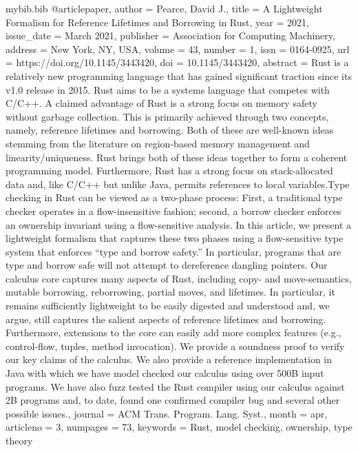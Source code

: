 \RequirePackage{filecontents}
\begin{filecontents*}{mybib.bib}
    @article{paper,
        author = {Pearce, David J.},
        title = {A Lightweight Formalism for Reference Lifetimes and Borrowing in Rust},
        year = {2021},
        issue_date = {March 2021},
        publisher = {Association for Computing Machinery},
        address = {New York, NY, USA},
        volume = {43},
        number = {1},
        issn = {0164-0925},
        url = {https://doi.org/10.1145/3443420},
        doi = {10.1145/3443420},
        abstract = {Rust is a relatively new programming language that has gained significant traction since its v1.0 release in 2015. Rust aims to be a systems language that competes with C/C++. A claimed advantage of Rust is a strong focus on memory safety without garbage collection. This is primarily achieved through two concepts, namely, reference lifetimes and borrowing. Both of these are well-known ideas stemming from the literature on region-based memory management and
            linearity/uniqueness. Rust brings both of these ideas together to form a coherent programming model. Furthermore, Rust has a strong focus on stack-allocated data and, like C/C++ but unlike Java, permits references to local variables.Type checking in Rust can be viewed as a two-phase process: First, a traditional type checker operates in a flow-insensitive fashion; second, a borrow checker enforces an ownership invariant using a flow-sensitive analysis. In this article, we present a
            lightweight formalism that captures these two phases using a flow-sensitive type system that enforces “type and borrow safety.” In particular, programs that are type and borrow safe will not attempt to dereference dangling pointers. Our calculus core captures many aspects of Rust, including copy- and move-semantics, mutable borrowing, reborrowing, partial moves, and lifetimes. In particular, it remains sufficiently lightweight to be easily digested and understood and, we argue,
            still captures the salient aspects of reference lifetimes and borrowing. Furthermore, extensions to the core can easily add more complex features (e.g., control-flow, tuples, method invocation). We provide a soundness proof to verify our key claims of the calculus. We also provide a reference implementation in Java with which we have model checked our calculus using over 500B input programs. We have also fuzz tested the Rust compiler using our calculus against 2B programs and, to date,
        found one confirmed compiler bug and several other possible issues.},
        journal = {ACM Trans. Program. Lang. Syst.},
        month = {apr},
        articleno = {3},
        numpages = {73},
        keywords = {Rust, model checking, ownership, type theory}
    }
\end{filecontents*}
\documentclass[acmlarge, noacm, 11pt]{acmart}

